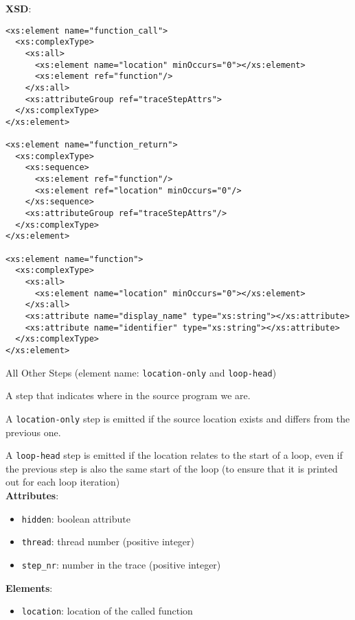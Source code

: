 \documentclass[12pt]{article}
\begin{document}
\noindent\textbf{XSD}:
\begin{verbatim}
<xs:element name="function_call">
  <xs:complexType>
    <xs:all>
      <xs:element name="location" minOccurs="0"></xs:element>
      <xs:element ref="function"/>
    </xs:all>
    <xs:attributeGroup ref="traceStepAttrs">
  </xs:complexType>
</xs:element>

<xs:element name="function_return">
  <xs:complexType>
    <xs:sequence>
      <xs:element ref="function"/>
      <xs:element ref="location" minOccurs="0"/>
    </xs:sequence>
    <xs:attributeGroup ref="traceStepAttrs"/>
  </xs:complexType>
</xs:element>

<xs:element name="function">
  <xs:complexType>
    <xs:all>
      <xs:element name="location" minOccurs="0"></xs:element>
    </xs:all>
    <xs:attribute name="display_name" type="xs:string"></xs:attribute>
    <xs:attribute name="identifier" type="xs:string"></xs:attribute>
  </xs:complexType>
</xs:element>
\end{verbatim}


\begin{center}
  {\Large All Other Steps} (element name: \texttt{location-only} and
\texttt{loop-head})
\end{center}

\noindent A step that indicates where in the source program we are.

A \texttt{location-only} step is emitted if the source location exists and
differs from the previous one.

A  \texttt{loop-head} step is emitted if the location relates to the start of a loop,
even if the previous step is also the same start of the loop (to ensure
that it is printed out for each loop iteration) \\

\noindent\textbf{Attributes}:
\begin{itemize}
\item \texttt{hidden}: boolean attribute
\item \texttt{thread}: thread number (positive integer)
\item \texttt{step\_nr}: number in the trace (positive integer)
\end{itemize}

\noindent\textbf{Elements}:
\begin{itemize}
\item \texttt{location}: location of the called function
\end{itemize}
\end{document}
